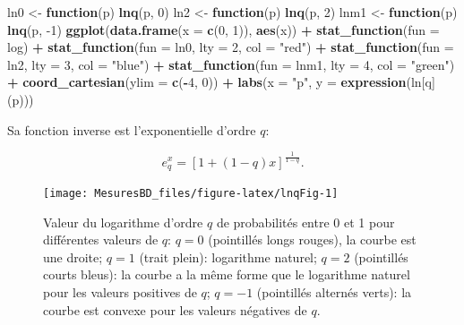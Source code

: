 \documentclass[
  11pt,
  french,
  a4paper,
  extrafontsizes,onecolumn,openright
  ]{memoir}
\newenvironment{Shaded}{\begin{snugshade}}{\end{snugshade}}
\newcommand{\ControlFlowTok}[1]{\textcolor[rgb]{0.13,0.29,0.53}{\textbf{#1}}}
\newcommand{\DataTypeTok}[1]{\textcolor[rgb]{0.13,0.29,0.53}{#1}}
\newcommand{\DecValTok}[1]{\textcolor[rgb]{0.00,0.00,0.81}{#1}}
\newcommand{\KeywordTok}[1]{\textcolor[rgb]{0.13,0.29,0.53}{\textbf{#1}}}
\newcommand{\NormalTok}[1]{#1}
\newcommand{\OperatorTok}[1]{\textcolor[rgb]{0.81,0.36,0.00}{\textbf{#1}}}
\newcommand{\StringTok}[1]{\textcolor[rgb]{0.31,0.60,0.02}{#1}}
\begin{document}
\begin{Shaded}
\begin{Highlighting}[]
\NormalTok{ln0 <-}\StringTok{ }\ControlFlowTok{function}\NormalTok{(p) }\KeywordTok{lnq}\NormalTok{(p, }\DecValTok{0}\NormalTok{)}
\NormalTok{ln2 <-}\StringTok{ }\ControlFlowTok{function}\NormalTok{(p) }\KeywordTok{lnq}\NormalTok{(p, }\DecValTok{2}\NormalTok{)}
\NormalTok{lnm1 <-}\StringTok{ }\ControlFlowTok{function}\NormalTok{(p) }\KeywordTok{lnq}\NormalTok{(p, }\DecValTok{-1}\NormalTok{)}
\KeywordTok{ggplot}\NormalTok{(}\KeywordTok{data.frame}\NormalTok{(}\DataTypeTok{x =} \KeywordTok{c}\NormalTok{(}\DecValTok{0}\NormalTok{, }\DecValTok{1}\NormalTok{)), }\KeywordTok{aes}\NormalTok{(x)) }\OperatorTok{+}\StringTok{ }
\StringTok{    }\KeywordTok{stat_function}\NormalTok{(}\DataTypeTok{fun =}\NormalTok{ log) }\OperatorTok{+}
\StringTok{    }\KeywordTok{stat_function}\NormalTok{(}\DataTypeTok{fun =}\NormalTok{ ln0, }\DataTypeTok{lty =} \DecValTok{2}\NormalTok{, }\DataTypeTok{col =} \StringTok{"red"}\NormalTok{) }\OperatorTok{+}
\StringTok{    }\KeywordTok{stat_function}\NormalTok{(}\DataTypeTok{fun =}\NormalTok{ ln2, }\DataTypeTok{lty =} \DecValTok{3}\NormalTok{, }\DataTypeTok{col =} \StringTok{"blue"}\NormalTok{) }\OperatorTok{+}
\StringTok{    }\KeywordTok{stat_function}\NormalTok{(}\DataTypeTok{fun =}\NormalTok{ lnm1, }\DataTypeTok{lty =} \DecValTok{4}\NormalTok{, }\DataTypeTok{col =} \StringTok{"green"}\NormalTok{) }\OperatorTok{+}
\StringTok{    }\KeywordTok{coord_cartesian}\NormalTok{(}\DataTypeTok{ylim =} \KeywordTok{c}\NormalTok{(}\OperatorTok{-}\DecValTok{4}\NormalTok{, }\DecValTok{0}\NormalTok{)) }\OperatorTok{+}
\StringTok{    }\KeywordTok{labs}\NormalTok{(}\DataTypeTok{x =} \StringTok{"p"}\NormalTok{, }\DataTypeTok{y =} \KeywordTok{expression}\NormalTok{(ln[q](p)))}
\end{Highlighting}
\end{Shaded}

\normalsize

Sa fonction inverse est l'exponentielle d'ordre \(q\):

\begin{equation}
  \label{eq:expq}
  e^x_q = \left[ 1+\left( 1-q \right)x \right]^{\frac{1}{1-q}}.
\end{equation}



\scriptsize

\begin{figure}

{\centering \texttt{[image: MesuresBD\_files/figure-latex/lnqFig-1]} 

}

\caption{Valeur du logarithme d'ordre \(q\) de probabilités entre 0 et 1 pour différentes valeurs de \(q\): \(q = 0\) (pointillés longs rouges), la courbe est une droite; \(q = 1\) (trait plein): logarithme naturel; \(q = 2\) (pointillés courts bleus): la courbe a la même forme que le logarithme naturel pour les valeurs positives de \(q\); \(q =-1\) (pointillés alternés verts): la courbe est convexe pour les valeurs négatives de \(q\).}\label{fig:lnqFig}
\end{figure}
\end{document}
